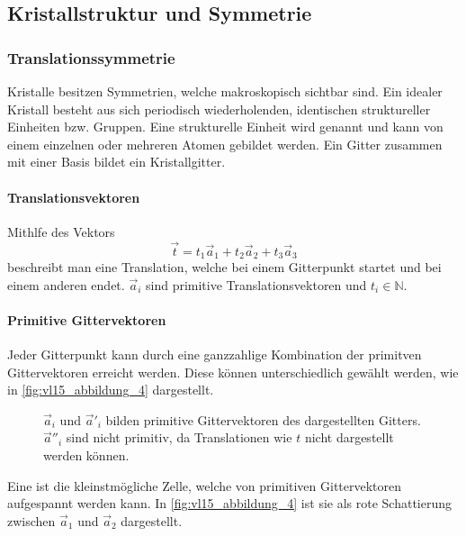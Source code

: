\subsection{Kristallstruktur und Symmetrie}
\subsubsection{Translationssymmetrie}
	Kristalle besitzen Symmetrien, welche makroskopisch sichtbar sind. 
	Ein idealer Kristall besteht aus sich periodisch wiederholenden, identischen struktureller Einheiten bzw. Gruppen. 
	Eine strukturelle Einheit wird  genannt und kann von einem einzelnen oder mehreren Atomen gebildet werden. 
	Ein Gitter zusammen mit einer Basis bildet ein Kristallgitter.
\paragraph{Translationsvektoren}
	Mithlfe des Vektors 
	\begin{equation}
		\label{eq:II.2.14}
		\Vec{t} = t_1 \Vec{a}_{1} + t_2 \Vec{a}_{2} + t_3 \Vec{a}_{3}
	\end{equation}
	beschreibt man eine Translation, welche bei einem Gitterpunkt startet und bei einem anderen endet. $\Vec{a}_{i}$ sind primitive Translationsvektoren und $t_{i} \in \mathbb{N}$.
\paragraph{Primitive Gittervektoren}
	{Jeder} Gitterpunkt kann durch eine ganzzahlige Kombination der primitven Gittervektoren erreicht werden. 
	Diese können unterschiedlich gewählt werden, wie in \autoref{fig:vl15_abbildung_4} dargestellt.
	\begin{figure}[H]
		\centering
		\caption{
			$\vec a_i$ und $\vec a'_i$ bilden primitive Gittervektoren des dargestellten Gitters.\\
			$\vec a''_i$ sind nicht primitiv, da Translationen wie $t$ nicht dargestellt werden können.
		}
		\label{fig:vl15_abbildung_4}
	\end{figure}

	Eine  ist die kleinstmögliche Zelle, welche von primitiven Gittervektoren aufgespannt werden kann. 
	In \autoref{fig:vl15_abbildung_4} ist sie als rote Schattierung zwischen $\vec a_1$ und $\vec a_2$ dargestellt.


